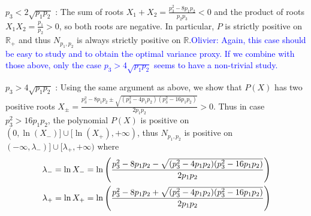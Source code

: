 \documentclass[a4paper, 10pt]{article}
\newcommand{\bea}{\begin{eqnarray}}
\newcommand{\eea}{\end{eqnarray}}
\theoremstyle{definition}
\begin{document}
\begin{description}[font=$\bullet$~\normalfont\scshape\color{red!50!black}]

\item $p_3<2\sqrt{p_1p_2}$ : The sum of roots $X_1+X_2 = \frac{p_3^2-8p_1p_2}{p_2p_3} < 0$ and the product of roots $X_1 X_2 = \frac{p_1}{p_2}>0$, so both roots are negative. In particular, $P$ is strictly positive on  $\mathbb{R}_+$ and thus $N_{p_1,p_2}$ is always strictly positive on $\mathbb{R}$.\textcolor{blue}{Olivier: Again, this case should be easy to study and to obtain the optimal variance proxy. If we combine with those above, only the case $p_3 > 4\sqrt{p_1p_2}$ seems to have a non-trivial study.}
\item  $p_3 > 4\sqrt{p_1p_2}$ : Using the same argument as above, we show that $P(X)$ has two positive roots $X_{\pm}=\frac{p_3^2-8p_1p_2\pm\sqrt{(p_3^2-4p_1p_2)(p_3^2-16p_1p_2)}}{2p_1p_2} > 0$. Thus in case $p_3^2>16p_1p_2$, the polynomial $P(X)$ is positive on $(0, \ln(X_-)] \cup[\ln(X_+), +\infty)$, thus $N_{p_1,p_2}$ is positive on $(-\infty, \lambda_-)] \cup[\lambda_+, +\infty)$ where 
\bea \lambda_{-} =\ln X_-= \ln\left(\frac{p_3^2-8p_1p_2 - \sqrt{(p_3^2-4p_1p_2)(p_3^2-16p_1p_2)}}{2p_1p_2}\right) \cr \lambda_{+} = \ln X_+=\ln\left(\frac{p_3^2-8p_1p_2 +  \sqrt{(p_3^2-4p_1p_2)(p_3^2-16p_1p_2)}}{2p_1p_2}\right) \eea
\end{description}
\end{document}
